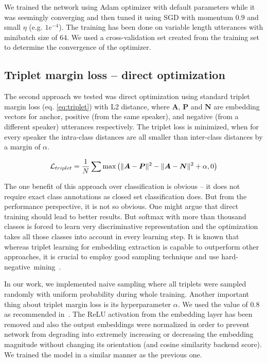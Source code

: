 \pagebreak
\noindent
We trained the network using Adam optimizer with default parameters while it was seemingly converging and then tuned it using SGD with momentum $ 0.9 $ and small $ \eta $ (e.g. $ 1e^{-4} $). The training has been done on variable length utterances with minibatch size of 64. We used a cross-validation set created from the training set to determine the convergence of the optimizer.

\subsection*{Triplet margin loss -- direct optimization}

The second approach we tested was direct optimization using standard triplet margin loss (eq. \ref{eq:triplet}) with L2 distance, where $ \boldsymbol{A} $, $ \boldsymbol{P} $ and $ \boldsymbol{N} $ are embedding vectors for anchor, positive (from the same speaker), and negative (from a different speaker) utterances respectively. The triplet loss is minimized, when for every speaker the intra-class distances are all smaller than inter-class distances by a margin of $ \alpha $.

\begin{equation} \label{eq:triplet}
\mathcal{L}_{triplet} = \frac{1}{N} \sum \textnormal{max}
\left( 
\lVert\boldsymbol{A} - \boldsymbol{P}\rVert^2 - 
\lVert\boldsymbol{A} - \boldsymbol{N}\rVert^2 
+ \alpha, 0 \right)
\end{equation}

\noindent
The one benefit of this approach over classification is obvious -- it does not require exact class annotations as closed set classification does. But from the performance perspective, it is not so obvious. One might argue that direct training should lead to better results. But softmax with more than thousand classes is forced to learn very discriminative representation and the optimization takes all those classes into account in every learning step. It is known that whereas triplet learning for embedding extraction is capable to outperform other approaches, it is crucial to employ good sampling technique and use hard-negative~mining~\cite{YuanYZ16}.

\medskip
In our work, we implemented naive sampling where all triplets were sampled randomly with uniform probability during whole training. Another important thing about triplet margin loss is its hyperparameter $ \alpha $. We used the value of 0.8 as recommended in~\cite{x_vectors_triplet}. The ReLU activation from the embedding layer has been removed and also the output embeddings were normalized in order to prevent network from degrading into extremely increasing or decreasing the embedding magnitude without changing its orientation (and cosine similarity backend score). We trained the model in a similar manner as the previous one.

